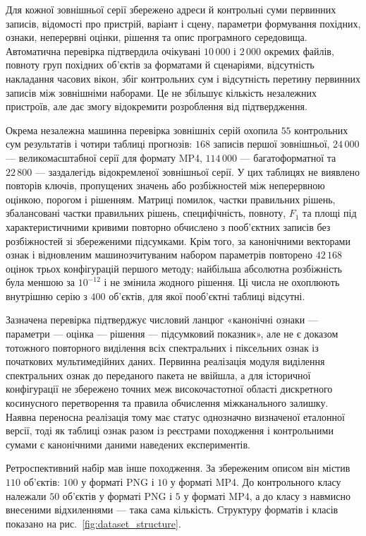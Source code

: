 Для кожної зовнішньої серії збережено адреси й контрольні суми первинних записів, відомості про пристрій, варіант і сцену, параметри формування похідних, ознаки, неперервні оцінки, рішення та опис програмного середовища. Автоматична перевірка підтвердила очікувані $10\,000$ і $2\,000$ окремих файлів, повноту груп похідних об’єктів за форматами й сценаріями, відсутність накладання часових вікон, збіг контрольних сум і відсутність перетину первинних записів між зовнішніми наборами. Це не збільшує кількість незалежних пристроїв, але дає змогу відокремити розроблення від підтвердження.

Окрема незалежна машинна перевірка зовнішніх серій охопила $55$ контрольних сум результатів і чотири таблиці прогнозів: $168$ записів першої зовнішньої, $24\,000$ --- великомасштабної серії для формату MP4, $114\,000$ --- багатоформатної та $22\,800$ --- заздалегідь відокремленої зовнішньої серії. У цих таблицях не виявлено повторів ключів, пропущених значень або розбіжностей між неперервною оцінкою, порогом і рішенням. Матриці помилок, частки правильних рішень, збалансовані частки правильних рішень, специфічність, повноту, $F_1$ та площі під характеристичними кривими повторно обчислено з пооб’єктних записів без розбіжностей зі збереженими підсумками. Крім того, за канонічними векторами ознак і відновленим машинозчитуваним набором параметрів повторено $42\,168$ оцінок трьох конфігурацій першого методу; найбільша абсолютна розбіжність була меншою за $10^{-12}$ і не змінила жодного рішення. Ці числа не охоплюють внутрішню серію з $400$ об’єктів, для якої пооб’єктні таблиці відсутні.

Зазначена перевірка підтверджує числовий ланцюг «канонічні ознаки --- параметри --- оцінка --- рішення --- підсумковий показник», але не є доказом тотожного повторного виділення всіх спектральних і піксельних ознак із початкових мультимедійних даних. Первинна реалізація модуля виділення спектральних ознак до переданого пакета не ввійшла, а для історичної конфігурації не збережено точних меж високочастотної області дискретного косинусного перетворення та правила обчислення міжканального залишку. Наявна переносна реалізація тому має статус однозначно визначеної еталонної версії, тоді як таблиці ознак разом із реєстрами походження і контрольними сумами є канонічними даними наведених експериментів.

Ретроспективний набір мав інше походження. За збереженим описом він містив $110$ об’єктів: $100$ у форматі PNG і $10$ у форматі MP4. До контрольного класу належали $50$ об’єктів у форматі PNG і $5$ у форматі MP4, а до класу з навмисно внесеними відхиленнями --- така сама кількість. Структуру форматів і класів показано на рис.~\ref{fig:dataset_structure}.

